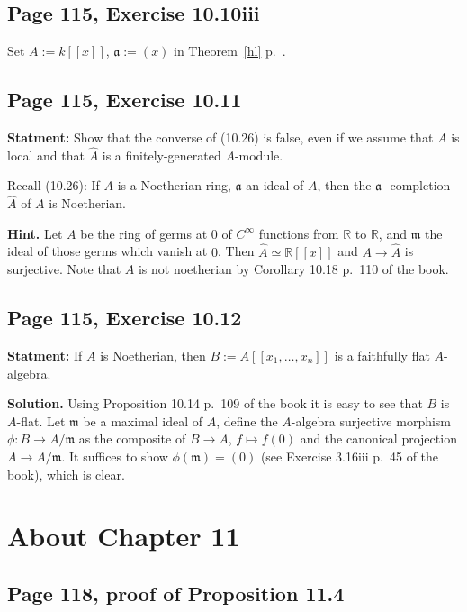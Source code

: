 \documentclass[parskip=half,fontsize=12pt]{scrartcl}%
\newcommand{\mf}{\mathfrak}
\newcommand{\aaa}{\mf a}
\newcommand{\mmm}{\mf m}
\newcommand{\nnn}{\mf n}
\begin{document}
\subsection{Page 115, Exercise 10.10iii}%

Set $A:=k[[x]]$, $\aaa:=(x)$ in Theorem~\ref{hl} p.~\pageref{hl}. 

\subsection{Page 115, Exercise 10.11}%

\textbf{Statment:} Show that the converse of (10.26) is false, even if we assume that $A$ is local and that $\widehat A$ is a finitely-generated $A$-module.

Recall (10.26): If $A$ is a Noetherian ring, $\aaa$ an ideal of $A$, then the $\aaa$-
completion $\widehat A$ of $A$ is Noetherian.

\textbf{Hint.} Let $A$ be the ring of germs at $0$ of $C^\infty$ functions from $\mathbb R$ to $\mathbb R$, and $\mmm$ the ideal of those germs which vanish at $0$. Then $\widehat A\simeq\mathbb R[[x]]$ and $A\to\widehat A$ is surjective. Note that $A$ is not noetherian by Corollary 10.18 p.~110 of the book. 

\subsection{Page 115, Exercise 10.12}%

\textbf{Statment:} If $A$ is Noetherian, then $B:=A[[x_1,\ldots,x_n]]$ is a faithfully flat $A$-algebra. 

\textbf{Solution.} Using Proposition 10.14 p.~109 of the book it is easy to see that $B$ is $A$-flat. Let $\mmm$ be a maximal ideal of $A$, define the $A$-algebra surjective morphism $\phi:B\to A/\mmm$ as the composite of $B\to A$, $f\mapsto f(0)$ and the canonical projection $A\to A/\mmm$. %
It suffices to show $\phi(\mmm)=(0)$ (see Exercise 3.16iii p.~45 of the book), which is clear. 

\section{About Chapter 11}%

\subsection{Page 118, proof of Proposition 11.4}%
\end{document}
